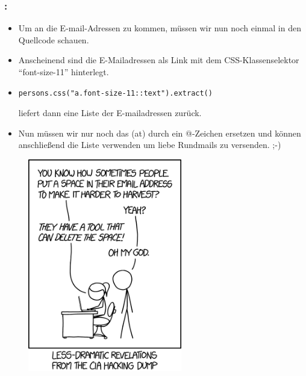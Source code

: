 \documentclass{beamer}
\begin{document}
\framebreak

\begin{frame}[fragile]
	\frametitle{\insertsection{}: \insertsubsection{}}
	\begin{itemize}
		\item Um an die E-mail-Adressen zu kommen, müssen wir nun noch einmal in den
		Quellcode schauen.
		\item Anscheinend sind die E-Mailadressen als Link mit dem
		CSS-Klassenselektor "`font-size-11"' hinterlegt.
		\item \begin{lstlisting}  
persons.css("a.font-size-11::text").extract()
			\end{lstlisting}
			liefert dann eine Liste der E-mailadressen zurück.
		\item Nun müssen wir nur noch das (at) durch ein @-Zeichen ersetzen und können
		anschließend die Liste verwenden um liebe Rundmails zu versenden. ;-)
	\end{itemize}
\end{frame}

\framebreak

\begin{figure}
	\begin{center}
		\includegraphics[width=0.6\textwidth]{texsrc/hacking_xkcd}
	\end{center}
	\label{fig:XKCD_HACKING}
\end{figure}
\end{document}
